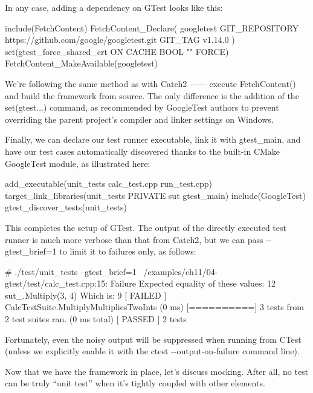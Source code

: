 In any case, adding a dependency on GTest looks like this:


\begin{cmake}
include(FetchContent)
FetchContent_Declare(
    googletest
    GIT_REPOSITORY https://github.com/google/googletest.git
    GIT_TAG v1.14.0
)
set(gtest_force_shared_crt ON CACHE BOOL "" FORCE)
FetchContent_MakeAvailable(googletest)
\end{cmake}

We’re following the same method as with Catch2 —— execute FetchContent() and build the framework from source. The only difference is the addition of the set(gtest...) command, as recommended by GoogleTest authors to prevent overriding the parent project’s compiler and linker settings on Windows.

Finally, we can declare our test runner executable, link it with gtest\_main, and have our test cases automatically discovered thanks to the built-in CMake GoogleTest module, as illustrated here:


\begin{cmake}
add_executable(unit_tests
               calc_test.cpp
               run_test.cpp)
target_link_libraries(unit_tests PRIVATE sut gtest_main)
include(GoogleTest)
gtest_discover_tests(unit_tests)
\end{cmake}

This completes the setup of GTest. The output of the directly executed test runner is much more verbose than that from Catch2, but we can pass -{}-gtest\_brief=1 to limit it to failures only, as follows:

\begin{shell}
# ./test/unit_tests --gtest_brief=1
~/examples/ch11/04-gtest/test/calc_test.cpp:15: Failure
Expected equality of these values:
  12
  sut_.Multiply(3, 4)
    Which is: 9
[ FAILED ] CalcTestSuite.MultiplyMultipliesTwoInts (0 ms)
[==========] 3 tests from 2 test suites ran. (0 ms total)
[ PASSED ] 2 tests
\end{shell}

Fortunately, even the noisy output will be suppressed when running from CTest (unless we explicitly enable it with the ctest -{}-output-on-failure command line).

Now that we have the framework in place, let’s discuss mocking. After all, no test can be truly “unit test” when it’s tightly coupled with other elements.

